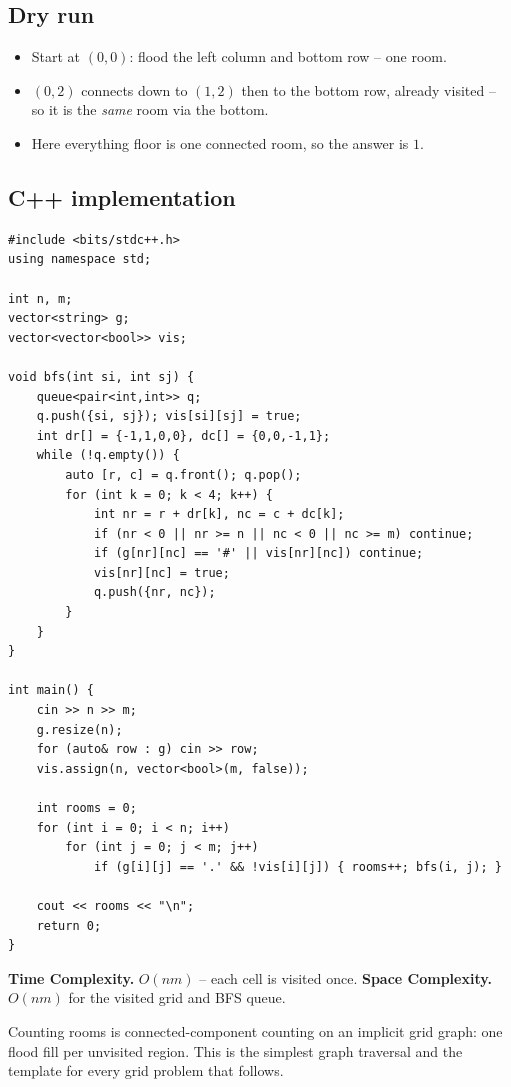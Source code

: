 \subsection*{Dry run}


\begin{itemize}
  \item Start at $(0,0)$: flood the left column and bottom row -- one
        room.
  \item $(0,2)$ connects down to $(1,2)$ then to the bottom row, already
        visited -- so it is the \emph{same} room via the bottom.
  \item Here everything floor is one connected room, so the answer is
        $1$.
\end{itemize}

\subsection*{C++ implementation}

\begin{lstlisting}
#include <bits/stdc++.h>
using namespace std;

int n, m;
vector<string> g;
vector<vector<bool>> vis;

void bfs(int si, int sj) {
    queue<pair<int,int>> q;
    q.push({si, sj}); vis[si][sj] = true;
    int dr[] = {-1,1,0,0}, dc[] = {0,0,-1,1};
    while (!q.empty()) {
        auto [r, c] = q.front(); q.pop();
        for (int k = 0; k < 4; k++) {
            int nr = r + dr[k], nc = c + dc[k];
            if (nr < 0 || nr >= n || nc < 0 || nc >= m) continue;
            if (g[nr][nc] == '#' || vis[nr][nc]) continue;
            vis[nr][nc] = true;
            q.push({nr, nc});
        }
    }
}

int main() {
    cin >> n >> m;
    g.resize(n);
    for (auto& row : g) cin >> row;
    vis.assign(n, vector<bool>(m, false));

    int rooms = 0;
    for (int i = 0; i < n; i++)
        for (int j = 0; j < m; j++)
            if (g[i][j] == '.' && !vis[i][j]) { rooms++; bfs(i, j); }

    cout << rooms << "\n";
    return 0;
}
\end{lstlisting}

\begin{complexitybox}
\textbf{Time Complexity.} $O(nm)$ -- each cell is visited once.
\textbf{Space Complexity.} $O(nm)$ for the visited grid and BFS queue.
\end{complexitybox}

\begin{takeawaybox}
Counting rooms is connected-component counting on an implicit grid graph:
one flood fill per unvisited region. This is the simplest graph traversal
and the template for every grid problem that follows.
\end{takeawaybox}
